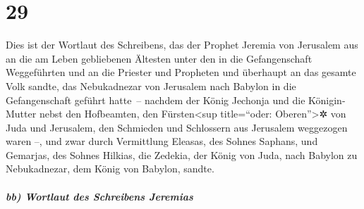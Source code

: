 \hypertarget{section-28}{%
\section{29}\label{section-28}}

Dies ist der Wortlaut des Schreibens, das der Prophet
Jeremia von Jerusalem aus an die am Leben gebliebenen Ältesten unter den
in die Gefangenschaft Weggeführten und an die Priester und Propheten und
überhaupt an das gesamte Volk sandte, das Nebukadnezar von Jerusalem
nach Babylon in die Gefangenschaft geführt hatte~--
nachdem der König Jechonja und die Königin-Mutter nebst
den Hofbeamten, den Fürsten\textless sup title=``oder:
Oberen''\textgreater✲ von Juda und Jerusalem, den Schmieden und
Schlossern aus Jerusalem weggezogen waren --, und zwar
durch Vermittlung Eleasas, des Sohnes Saphans, und Gemarjas, des Sohnes
Hilkias, die Zedekia, der König von Juda, nach Babylon zu Nebukadnezar,
dem König von Babylon, sandte.

\hypertarget{bb-wortlaut-des-schreibens-jeremias}{%
\subparagraph{bb) Wortlaut des Schreibens
Jeremias}\label{bb-wortlaut-des-schreibens-jeremias}}

